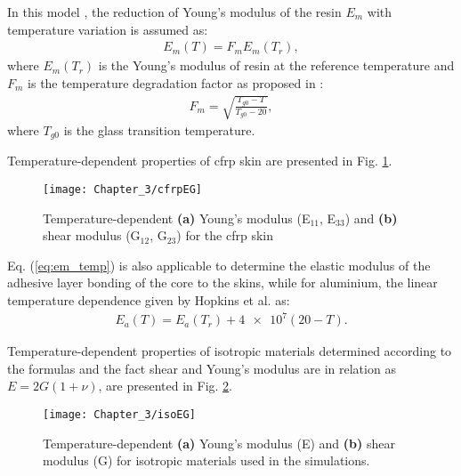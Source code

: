 In this model \cite{salamone2009guided, hopkins2012extreme}, the reduction of Young’s modulus of the resin \(E_m\) with temperature variation is assumed as:
\begin{eqnarray}
	E_m(T)=F_m E_{m}(T_r),
	\label{eq:factor_temp}
\end{eqnarray}
%
%
%
where \(E_{m}(T_r)\) is the Young’s modulus of resin at the reference temperature and \(F_m\) is the temperature degradation factor as proposed in \cite{chamis1983simplified}:
\begin{eqnarray}
F_m=\sqrt{\frac{T_{g0}-T}{T_{g0}-20}},
\label{eq:em_temp}
\end{eqnarray}
%
%
where \(T_{g0}\) is the glass transition temperature.

Temperature-dependent properties of \ac{cfrp} skin are presented in Fig. \ref{fig:cfrpEG}.
\begin{figure}
	\begin{center}
		\texttt{[image: Chapter\_3/cfrpEG]}
	\end{center}
	\caption{Temperature-dependent \textbf{(a)} Young's modulus (E\(_{11}\), E\(_{33}\)) and \textbf{(b)} shear modulus (G\(_{12}\), G\(_{23}\)) for the \acf{cfrp} skin}
	\label{fig:cfrpEG}
\end{figure}

Eq. (\ref{eq:em_temp}) is also applicable to determine the elastic modulus of the adhesive layer bonding of the core to the skins, while for aluminium, the linear temperature dependence given by Hopkins et al. \cite{hopkins2012extreme} as:
\begin{eqnarray}
	E_a(T)=E_a(T_{r})+\num{4e7}(20-T).
	\label{eq:aluminium_temp}
\end{eqnarray}

Temperature-dependent properties of isotropic materials determined according to the formulas and the fact shear and Young's modulus are in relation as \(E=2G(1+\nu)\), are presented in Fig. \ref{fig:isoEG}.
\begin{figure}
	\begin{center}
		\texttt{[image: Chapter\_3/isoEG]}
	\end{center}
	\caption{Temperature-dependent \textbf{(a)} Young's modulus (E) and \textbf{(b)} shear modulus (G) for isotropic materials used in the simulations.}
	\label{fig:isoEG}
\end{figure}

